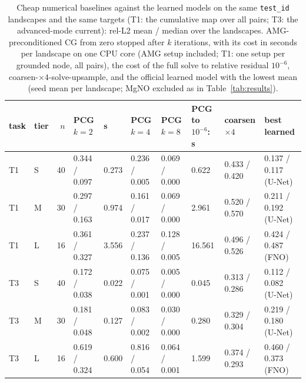 \begin{table}[tb]
\centering
\scriptsize
\setlength{\tabcolsep}{3.5pt}
\caption{Cheap numerical baselines against the learned models on the same \texttt{test\_id} landscapes and the same targets (T1: the cumulative map over all pairs; T3: the advanced-mode current): rel-L2 mean / median over the landscapes. AMG-preconditioned CG from zero stopped after $k$ iterations, with its cost in seconds per landscape on one CPU core (AMG setup included; T1: one setup per grounded node, all pairs), the cost of the full solve to relative residual $10^{-6}$, coarsen-$\times 4$-solve-upsample, and the official learned model with the lowest mean (seed mean per landscape; MgNO excluded as in Table~\ref{tab:results}).}
\label{tab:cheap}
\setlength{\tabcolsep}{2.2pt}
\begin{tabular}{llrlllllll}
\toprule
task & tier & $n$ & PCG $k=2$ & s & PCG $k=4$ & PCG $k=8$ & PCG to $10^{-6}$: s & coarsen $\times 4$ & best learned \\
\midrule
T1 & S & 40 & 0.344 / 0.097 & 0.273 & 0.236 / 0.005 & 0.069 / 0.000 & 0.622 & 0.433 / 0.420 & 0.137 / 0.117 (U-Net) \\
T1 & M & 30 & 0.297 / 0.163 & 0.974 & 0.161 / 0.017 & 0.069 / 0.000 & 2.961 & 0.520 / 0.570 & 0.211 / 0.192 (U-Net) \\
T1 & L & 16 & 0.361 / 0.327 & 3.556 & 0.237 / 0.136 & 0.128 / 0.005 & 16.561 & 0.496 / 0.526 & 0.424 / 0.487 (FNO) \\
T3 & S & 40 & 0.172 / 0.038 & 0.022 & 0.075 / 0.001 & 0.005 / 0.000 & 0.045 & 0.313 / 0.286 & 0.112 / 0.082 (U-Net) \\
T3 & M & 30 & 0.181 / 0.048 & 0.127 & 0.083 / 0.002 & 0.030 / 0.000 & 0.280 & 0.329 / 0.304 & 0.219 / 0.180 (U-Net) \\
T3 & L & 16 & 0.619 / 0.324 & 0.600 & 0.816 / 0.054 & 0.064 / 0.001 & 1.599 & 0.374 / 0.293 & 0.460 / 0.373 (FNO) \\
\bottomrule
\end{tabular}
\end{table}
